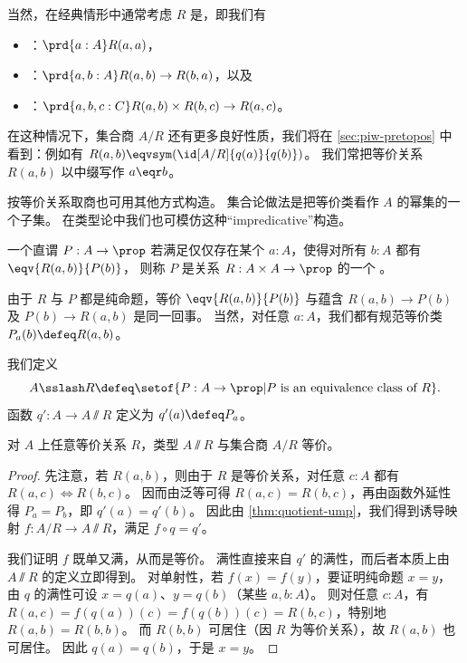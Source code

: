 当然，在经典情形中通常考虑 $R$ 是，即我们有
%
%
%
\begin{itemize}
\item {}：$\prd{a:A} R(a,a)$，
\item {}：$\prd{a,b:A} R(a,b) \to R(b,a)$，以及
\item {}：$\prd{a,b,c:C} R(a,b) \times R(b,c) \to R(a,c)$。
\end{itemize}
%
在这种情况下，集合商 $A/R$ 还有更多良好性质，我们将在 \cref{sec:piw-pretopos} 中看到：例如有 $R(a,b) \eqvsym (\id[A/R]{q(a)}{q(b)})$。
我们常把等价关系 $R(a,b)$ 以中缀写作 $a\eqr b$。

按等价关系取商也可用其他方式构造。
集合论做法是把等价类看作 $A$ 的幂集的一个子集。
在类型论中我们也可模仿这种“impredicative”构造。

\begin{defn}
  一个直谓 $P:A\to\prop$ 若满足仅仅存在某个 $a:A$，使得对所有 $b:A$ 都有 $\eqv{R(a,b)}{P(b)}$，
  则称 $P$ 是关系 $R : A \times A \to \prop$ 的一个
  。
\end{defn}

由于 $R$ 与 $P$ 都是纯命题，等价 $\eqv{R(a,b)}{P(b)}$ 与蕴含 $R(a,b) \to P(b)$ 及 $P(b) \to R(a,b)$ 是同一回事。
当然，对任意 $a:A$，我们都有规范等价类 $P_a(b) \defeq R(a,b)$。

\begin{defn}\label{def:VVquotient}
  我们定义
  \begin{equation*}
    A\sslash R \defeq \setof{ P:A\to\prop | P \text{ is an equivalence class of } R}.
  \end{equation*}
  函数 $q':A\to A\sslash R$ 定义为 $q'(a) \defeq P_a$。
\end{defn}

\begin{thm}
  对 $A$ 上任意等价关系 $R$，类型 $A\sslash R$ 与集合商 $A/R$ 等价。
\end{thm}
\begin{proof}
  先注意，若 $R(a,b)$，则由于 $R$ 是等价关系，对任意 $c:A$ 都有 $R(a,c) \Leftrightarrow R(b,c)$。
  因而由泛等可得 $R(a,c) = R(b,c)$，再由函数外延性得 $P_a=P_b$，即 $q'(a)=q'(b)$。
  因此由 \cref{thm:quotient-ump}，我们得到诱导映射 $f:A/R \to A\sslash R$，满足 $f\circ q = q'$。

  我们证明 $f$ 既单又满，从而是等价。
  满性直接来自 $q'$ 的满性，而后者本质上由 $A\sslash R$ 的定义立即得到。
  对单射性，若 $f(x)=f(y)$，要证明纯命题 $x=y$，由 $q$ 的满性可设 $x=q(a)$、$y=q(b)$（某些 $a,b:A$）。
  则对任意 $c:A$，有 $R(a,c) = f(q(a))(c) = f(q(b))(c) = R(b,c)$，特别地 $R(a,b) = R(b,b)$。
  而 $R(b,b)$ 可居住（因 $R$ 为等价关系），故 $R(a,b)$ 也可居住。
  因此 $q(a)=q(b)$，于是 $x=y$。
\end{proof}

